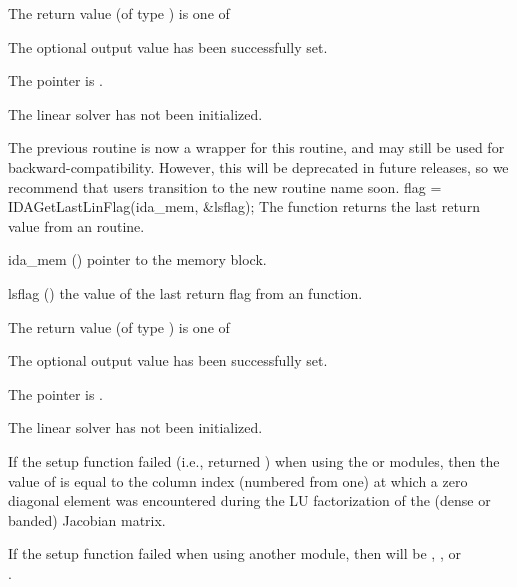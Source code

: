 {{\begin{args}[njvevals]
  \end{args}
}
{
  The return value  (of type ) is one of
  \begin{args}
  \item[\Id{IDA\_SUCCESS}]
    The optional output value has been successfully set.
  \item[\Id{IDA\_MEM\_NULL}]
    The  pointer is .
  \item[\Id{IDA\_LMEM\_NULL}]
    The {\ida} linear solver has not been initialized.
  \end{args}
}
{
  The previous routine  is now a wrapper for
  this routine, and may still be used for backward-compatibility.
  However, this will be deprecated in future releases, so we recommend
  that users transition to the new routine name soon.
}
{
  flag = IDAGetLastLinFlag(ida\_mem, \&lsflag);
}
{
  The function  returns the
  last return value from an {\idals} routine.
}
{
  \begin{args}
  \item[ida\_mem] ()
    pointer to the {\idas} memory block.
  \item[lsflag] ()
    the value of the last return flag from an {\idals} function.
  \end{args}
}
{
  The return value  (of type ) is one of
  \begin{args}
  \item[\Id{IDALS\_SUCCESS}]
    The optional output value has been successfully set.
  \item[\Id{IDALS\_MEM\_NULL}]
    The  pointer is .
  \item[\Id{IDALS\_LMEM\_NULL}]
    The {\idals} linear solver has not been initialized.
  \end{args}
}
{
  If the {\idals} setup function failed (i.e.,  returned
  ) when using the {\sunlinsoldense} or
  {\sunlinsolband} modules, then the value of  is equal to
  the column index (numbered from one) at which a zero diagonal
  element was encountered during the LU factorization of the (dense or
  banded) Jacobian matrix.

  If the {\idals} setup function failed when using another
  {\sunlinsol} module, then  will be
  , , or
  \\ \noindent {}.

}}
